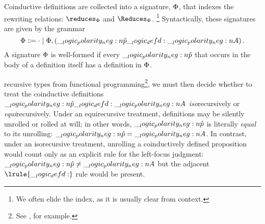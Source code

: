 

Coinductive definitions are collected into a signature, $\Phi$, that indexes the rewriting relations: $\reduces_{\orsig}$ and $\Reduces_{\orsig}$.%
\footnote[][-0.6\baselineskip]{We often elide the index, as it is usually clear from context.}
Syntactically, these signatures are given by the grammar
\begin{equation*}
  \Phi \Coloneqq \cdot \mid \Phi, (\__logic_polarity_neg:n {\hat{p}} \__logic_defd: \__logic_polarity_neg:n {A})
  \,.
\end{equation*}
A signature $\Phi$ is well-formed if every $\__logic_polarity_neg:n {\hat{p}}$ that occurs in the body of a definition itself has a definition in $\Phi$.

 recursive types from functional programming\footnote{See \textcite{Pierce:MIT02}, for example.}, we must then decide whether to treat the coinductive definitions $\__logic_polarity_neg:n {\hat{p}} \__logic_defd: \__logic_polarity_neg:n {A}$ \emph{iso}\-recursive\-ly or \emph{equi}\-recursively.
Under an equirecursive treatment, definitions may be silently unrolled or rolled at will;
in other words, $\__logic_polarity_neg:n {\hat{p}}$ is literally \emph{equal} to its unrolling: $\__logic_polarity_neg:n {\hat{p}} = \__logic_polarity_neg:n {A}$.
In contrast, under an isorecursive treatment, unrolling a coinductively defined proposition would count only as an explicit rule for the left-focus judgment: $\__logic_polarity_neg:n {\hat{p}} \neq \__logic_polarity_neg:n {A}$ but the adjacent $\lrule{\defd}$ rule would be present.%

